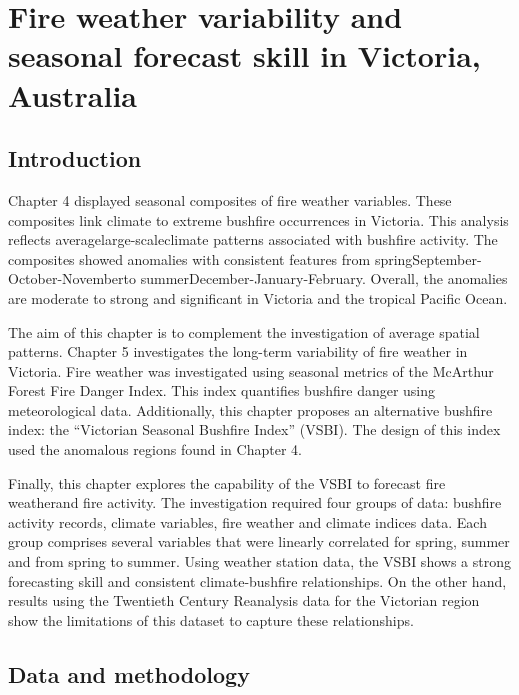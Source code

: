 
\chapter{Fire weather variability and seasonal forecast skill in Victoria, Australia}
\newpage{}


\section{Introduction}

Chapter 4 displayed seasonal composites of fire weather variables.
These composites link climate to extreme bushfire occurrences in Victoria.
This analysis reflects average\textemdash large-scale\textemdash climate
patterns associated with bushfire activity. The composites showed
anomalies with consistent features from spring\textemdash September-October-November\textemdash to
summer\textemdash December-January-February\textemdash . Overall,
the anomalies are moderate to strong and significant in Victoria and the tropical
Pacific Ocean. 

The aim of this chapter is to complement the investigation of average
spatial patterns. Chapter 5 investigates the long-term variability
of fire weather in Victoria. Fire weather was investigated using seasonal
metrics of the McArthur Forest Fire Danger Index. This index quantifies
bushfire danger using meteorological data. Additionally, this chapter
proposes an alternative bushfire index: the \textquotedblleft Victorian
Seasonal Bushfire Index\textquotedblright{} (VSBI). The design of
this index used the anomalous regions found in Chapter 4.

Finally, this chapter explores the capability of the VSBI to forecast
fire weather\textemdash and fire activity\textemdash . The investigation
required four groups of data: bushfire activity records, climate variables,
fire weather and climate indices data. Each group comprises several
variables that were linearly correlated for spring, summer and from
spring to summer. Using weather station data, the VSBI shows a strong
forecasting skill and consistent climate-bushfire relationships. On
the other hand, results using the Twentieth Century Reanalysis data
for the Victorian region show the limitations of this dataset to capture
these relationships. 


\section{Data and methodology}


